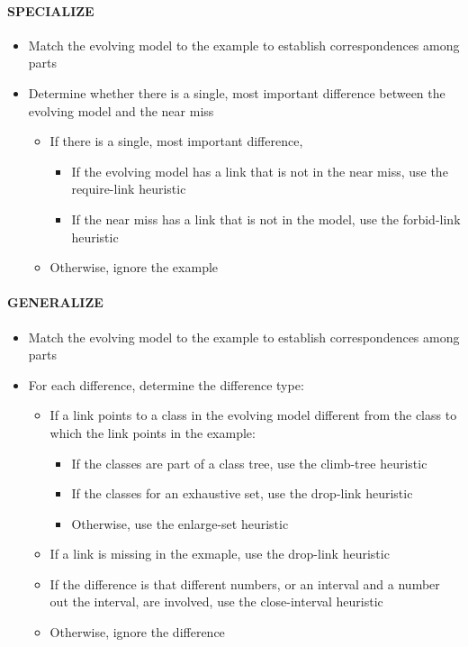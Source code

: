 \documentclass{article}
\begin{document}
\paragraph{SPECIALIZE}
\begin{itemize}
  \item Match the evolving model to the example to establish
    correspondences among parts
  \item Determine whether there is a single, most important
    difference between the evolving model and the near miss
  \begin{itemize}
    \item If there is a single, most important difference,
      \begin{itemize}
        \item If the evolving model has a link that is not in the
          near miss, use the require-link heuristic
        \item If the near miss has a link that is not in the model,
          use the forbid-link heuristic
      \end{itemize}
    \item Otherwise, ignore the example
  \end{itemize}
\end{itemize}

\paragraph{GENERALIZE}
\begin{itemize}
  \item Match the evolving model to the example to establish
    correspondences among parts
  \item For each difference, determine the difference type:
    \begin{itemize}
      \item If a link points to a class in the evolving model
        different from the class to which the link points in the
        example:
        \begin{itemize}
          \item If the classes are part of a class tree, use the
            climb-tree heuristic
          \item If the classes for an exhaustive set, use the
            drop-link heuristic
          \item Otherwise, use the enlarge-set heuristic
        \end{itemize}
      \item If a link is missing in the exmaple, use the drop-link
        heuristic
      \item If the difference is that different numbers, or an
        interval and a number out the interval, are involved, use
        the close-interval heuristic
      \item Otherwise, ignore the difference
    \end{itemize}
\end{itemize}
\end{document}
